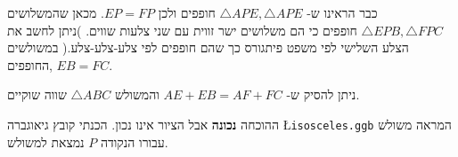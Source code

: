 \documentclass[12pt,a4paper]{article}
\begin{document}
כבר הראינו ש-%
$\triangle APE, \triangle APE$
חופפים ולכן
$EP=FP$.
מכאן שהמשלושים
$\triangle EPB, \triangle FPC$
חופפים כי הם משלושים ישר זווית עם שני צלעות שווים. )ניתן לחשב את הצלע השלישי לפי משפט פיתגורס כך שהם חופפים לפי צלע-צלע-צלע.( במשולשים החופפים,
$EB=FC$.

ניתן להסיק ש-%
$AE+EB=AF+FC$
והמשולש
$\triangle ABC$
שווה שוקיים.


ההוכחה
\textbf{%
נכונה%
}
אבל הציור אינו נכון. הכנתי קובץ גיאוגברה
\L{\texttt{isosceles.ggb}}
המראה משולש עבורו הנקודה
$P$
נמצאת 
\textbf{}
למשולש.





\newpage


\renewcommand{\refname}{\raggedleft\Large\R{מקורות}}

\end{document}
